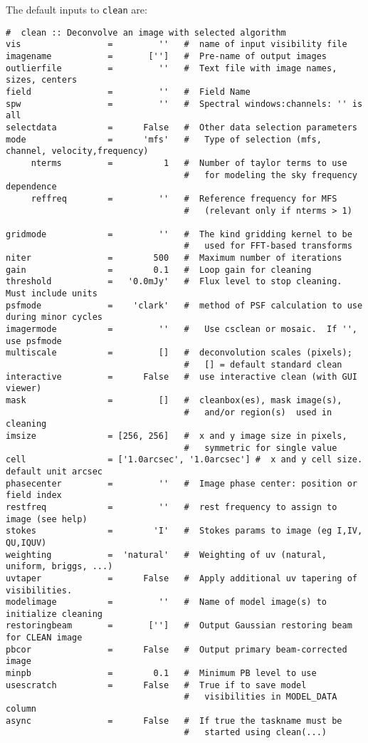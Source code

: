 The default inputs to {\tt clean} are:
\small
\begin{verbatim}
#  clean :: Deconvolve an image with selected algorithm
vis                 =         ''   #  name of input visibility file
imagename           =       ['']   #  Pre-name of output images
outlierfile         =         ''   #  Text file with image names, sizes, centers
field               =         ''   #  Field Name
spw                 =         ''   #  Spectral windows:channels: '' is all
selectdata          =      False   #  Other data selection parameters
mode                =      'mfs'   #   Type of selection (mfs, channel, velocity,frequency)
     nterms         =          1   #  Number of taylor terms to use
                                   #   for modeling the sky frequency dependence
     reffreq        =         ''   #  Reference frequency for MFS
                                   #   (relevant only if nterms > 1)

gridmode            =         ''   #  The kind gridding kernel to be
                                   #   used for FFT-based transforms
niter               =        500   #  Maximum number of iterations
gain                =        0.1   #  Loop gain for cleaning
threshold           =   '0.0mJy'   #  Flux level to stop cleaning.  Must include units
psfmode             =    'clark'   #  method of PSF calculation to use during minor cycles
imagermode          =         ''   #   Use csclean or mosaic.  If '', use psfmode
multiscale          =         []   #  deconvolution scales (pixels);
                                   #   [] = default standard clean
interactive         =      False   #  use interactive clean (with GUI viewer)
mask                =         []   #  cleanbox(es), mask image(s),
                                   #   and/or region(s)  used in cleaning
imsize              = [256, 256]   #  x and y image size in pixels,
                                   #   symmetric for single value
cell                = ['1.0arcsec', '1.0arcsec'] #  x and y cell size. default unit arcsec
phasecenter         =         ''   #  Image phase center: position or field index
restfreq            =         ''   #  rest frequency to assign to image (see help)
stokes              =        'I'   #  Stokes params to image (eg I,IV, QU,IQUV)
weighting           =  'natural'   #  Weighting of uv (natural, uniform, briggs, ...)
uvtaper             =      False   #  Apply additional uv tapering of  visibilities.
modelimage          =         ''   #  Name of model image(s) to initialize cleaning
restoringbeam       =       ['']   #  Output Gaussian restoring beam for CLEAN image
pbcor               =      False   #  Output primary beam-corrected image
minpb               =        0.1   #  Minimum PB level to use
usescratch          =      False   #  True if to save model
                                   #   visibilities in MODEL_DATA column
async               =      False   #  If true the taskname must be
                                   #   started using clean(...)
\end{verbatim}
\normalsize

